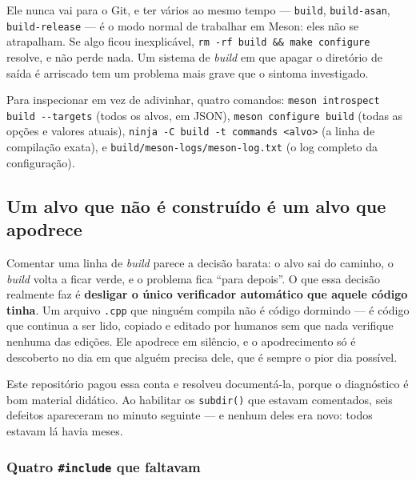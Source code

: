 \begin{regra}
Ele nunca vai para o Git, e ter vários ao mesmo tempo --- \texttt{build},
\texttt{build-asan}, \texttt{build-release} --- é o modo normal de trabalhar em
Meson: eles não se atrapalham. Se algo ficou inexplicável,
\texttt{rm -rf build \&\& make configure} resolve, e não perde nada. Um sistema
de \emph{build} em que apagar o diretório de saída é arriscado tem um problema
mais grave que o sintoma investigado.
\end{regra}

Para inspecionar em vez de adivinhar, quatro comandos:
\texttt{meson introspect build -{}-targets} (todos os alvos, em JSON),
\texttt{meson configure build} (todas as opções e valores atuais),
\texttt{ninja -C build -t commands <alvo>} (a linha de compilação exata), e
\texttt{build/meson-logs/meson-log.txt} (o log completo da configuração).

\subsection{Um alvo que não é construído é um alvo que apodrece}
\label{sec:alvo-apodrece}

\begin{porque}
Comentar uma linha de \emph{build} parece a decisão barata: o alvo sai do
caminho, o \emph{build} volta a ficar verde, e o problema fica ``para depois''.
O que essa decisão realmente faz é \textbf{desligar o único verificador
automático que aquele código tinha}. Um arquivo \texttt{.cpp} que ninguém
compila não é código dormindo --- é código que continua a ser lido, copiado e
editado por humanos sem que nada verifique nenhuma das edições. Ele apodrece em
silêncio, e o apodrecimento só é descoberto no dia em que alguém precisa dele,
que é sempre o pior dia possível.
\end{porque}

Este repositório pagou essa conta e resolveu documentá-la, porque o
diagnóstico é bom material didático. Ao habilitar os \texttt{subdir()} que
estavam comentados, seis defeitos apareceram no minuto seguinte --- e nenhum
deles era novo: todos estavam lá havia meses.

\subsubsection{Quatro \texttt{\#include} que faltavam}

